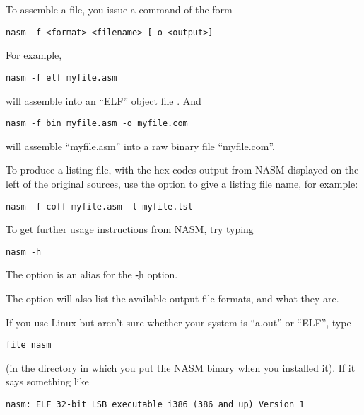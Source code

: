 %
%


To assemble a file, you issue a command of the form

\begin{lstlisting}
nasm -f <format> <filename> [-o <output>]
\end{lstlisting}

For example,

\begin{lstlisting}
nasm -f elf myfile.asm
\end{lstlisting}

will assemble  into an ``ELF'' object
file . And

\begin{lstlisting}
nasm -f bin myfile.asm -o myfile.com
\end{lstlisting}

will assemble ``myfile.asm'' into a raw binary file ``myfile.com''.

To produce a listing file, with the hex codes output from NASM
displayed on the left of the original sources, use the 
option to give a listing file name, for example:

\begin{lstlisting}
nasm -f coff myfile.asm -l myfile.lst
\end{lstlisting}

To get further usage instructions from NASM, try typing

\begin{lstlisting}
nasm -h
\end{lstlisting}

The option  is an alias for the \c{-h} option.

The option  will also list the available output
file formats, and what they are.

If you use Linux but aren't sure whether your system is
``a.out'' or ``ELF'', type

\begin{lstlisting}
file nasm
\end{lstlisting}

(in the directory in which you put the NASM binary when you
installed it). If it says something like

\begin{lstlisting}
nasm: ELF 32-bit LSB executable i386 (386 and up) Version 1
\end{lstlisting}

